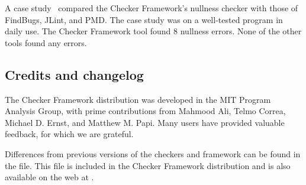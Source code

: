 A case study~\cite[\S6]{PapiACPE2008} compared the Checker Framework's nullness
checker with those of FindBugs, JLint, and PMD\@.  The case study was on a
well-tested program in daily use.  The Checker Framework tool found 8
nullness errors.  None of the other tools found any errors.



\subsection{Credits and changelog\label{credits}}

The Checker Framework distribution was developed in the MIT Program Analysis
Group, with prime contributions from Mahmood Ali, Telmo Correa, Michael
D. Ernst, and Matthew M. Papi.
Many users have provided valuable feedback, for which we are grateful.


Differences from previous versions of the checkers and framework can be found
in the  file.  This file is included in the
Checker Framework distribution and is also available on the web at
.






